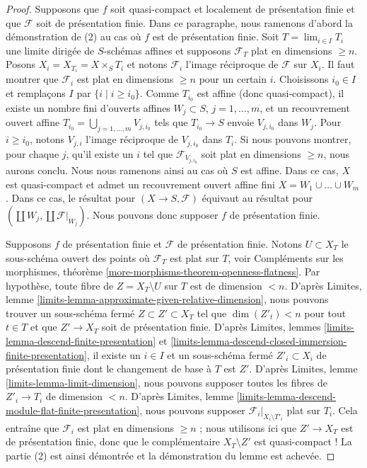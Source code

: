 \begin{proof}
\medskip\noindent
Supposons que $f$ soit quasi-compact et localement de présentation finie et
que $\mathcal{F}$ soit de présentation finie.
Dans ce paragraphe, nous ramenons d'abord la démonstration de (2) au cas où
$f$ est de présentation finie.
Soit $T = \lim_{i \in I} T_i$ une limite dirigée de
$S$-schémas affines et supposons $\mathcal{F}_T$ plat en dimensions
$\geq n$. Posons $X_i = X_{T_i} = X \times_S T_i$ et notons $\mathcal{F}_i$
l'image réciproque de $\mathcal{F}$ sur $X_i$. Il faut montrer que
$\mathcal{F}_i$ est plat en dimensions $\geq n$ pour un certain $i$.
Choisissons $i_0 \in I$ et remplaçons $I$ par $\{i \mid i \geq i_0\}$.
Comme $T_{i_0}$ est affine (donc quasi-compact), il existe un nombre fini
d'ouverts affines $W_j \subset S$, $j = 1, \ldots, m$, et un recouvrement ouvert affine
$T_{i_0} = \bigcup_{j = 1, \ldots, m} V_{j, i_0}$
tels que $T_{i_0} \to S$ envoie $V_{j, i_0}$ dans $W_j$.
Pour $i \geq i_0$, notons $V_{j, i}$ l'image réciproque de $V_{j, i_0}$
dans $T_i$. Si nous pouvons montrer, pour chaque $j$, qu'il existe un $i$ tel que
$\mathcal{F}_{V_{j, i_0}}$ soit plat en dimensions $\geq n$,
nous aurons conclu. Nous nous ramenons ainsi au cas où $S$ est affine.
Dans ce cas, $X$ est quasi-compact et admet un recouvrement ouvert
affine fini $X = W_1 \cup \ldots \cup W_m$. Dans ce cas,
le résultat pour $(X \to S, \mathcal{F})$ équivaut au résultat pour
$(\coprod W_j, \coprod \mathcal{F}|_{W_j})$. Nous pouvons donc supposer
$f$ de présentation finie.

\medskip\noindent
Supposons $f$ de présentation finie et $\mathcal{F}$ de présentation
finie. Notons $U \subset X_T$ le sous-schéma ouvert des points où
$\mathcal{F}_T$ est plat sur $T$, voir
Compléments sur les morphismes, théorème \ref{more-morphisms-theorem-openness-flatness}.
Par hypothèse, toute fibre de $Z = X_T \setminus U$ sur
$T$ est de dimension $< n$. D'après
Limites, lemme \ref{limits-lemma-approximate-given-relative-dimension},
nous pouvons trouver un sous-schéma fermé $Z \subset Z' \subset X_T$
tel que $\dim(Z'_t) < n$ pour tout $t \in T$ et que
$Z' \to X_T$ soit de présentation finie. D'après
Limites, lemmes \ref{limits-lemma-descend-finite-presentation} et
\ref{limits-lemma-descend-closed-immersion-finite-presentation},
il existe un $i \in I$ et un sous-schéma fermé $Z'_i \subset X_i$
de présentation finie dont le changement de base à $T$ est $Z'$. D'après
Limites, lemme \ref{limits-lemma-limit-dimension},
nous pouvons supposer toutes les fibres de $Z'_i \to T_i$ de dimension $< n$. D'après
Limites, lemme \ref{limits-lemma-descend-module-flat-finite-presentation},
nous pouvons supposer $\mathcal{F}_i|_{X_i \setminus T'_i}$
plat sur $T_i$. Cela entraîne que $\mathcal{F}_i$ est
plat en dimensions $\geq n$ ; nous utilisons ici que $Z' \to X_T$ est de présentation
finie, donc que le complémentaire $X_T \setminus Z'$ est quasi-compact !
La partie (2) est ainsi démontrée et la démonstration du lemme est achevée.
\end{proof}

